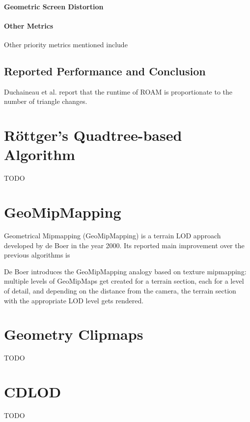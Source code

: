 \paragraph{Geometric Screen Distortion}

\paragraph{Other Metrics} Other priority metrics mentioned include 

\subsection{Reported Performance and Conclusion}
Duchaineau et al. report that the runtime of ROAM is proportionate to the 
number of triangle changes.

\section{Röttger's Quadtree-based Algorithm}
TODO

\section{GeoMipMapping}
Geometrical Mipmapping (GeoMipMapping) is a terrain LOD approach developed by de Boer \cite{geomipmapping} in the year 2000.
Its reported main improvement over the previous algorithms is 

De Boer introduces the GeoMipMapping analogy based on texture mipmapping: multiple levels of 
GeoMipMaps get created for a terrain section, each for a level of detail, and depending on the distance
from the camera, the terrain section with the appropriate LOD level gets rendered.

\section{Geometry Clipmaps}
TODO

\section{CDLOD}
TODO

